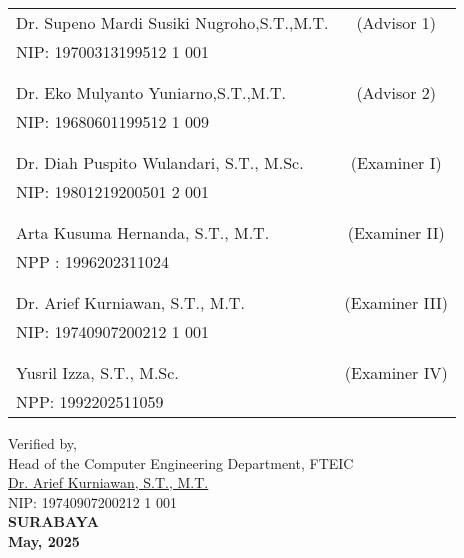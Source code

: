     \noindent
    \begin{tabularx}{\textwidth}{X c}
      Dr. Supeno Mardi Susiki Nugroho,S.T.,M.T.          & (Advisor 1) \\
      NIP: 19700313199512 1 001       & \\
      &  \\
      &  \\
      Dr. Eko Mulyanto Yuniarno,S.T.,M.T.     & (Advisor 2) \\
      NIP: 19680601199512 1 009       & \\
      &  \\
      &  \\
      Dr. Diah Puspito Wulandari, S.T., M.Sc.  & (Examiner I) \\
      NIP: 19801219200501 2 001      & \\
      &  \\
      &  \\
      Arta Kusuma Hernanda, S.T., M.T.  & (Examiner II) \\
      NPP : 1996202311024       & \\
      &  \\
      &  \\
      Dr. Arief Kurniawan, S.T., M.T.           & (Examiner III) \\
      NIP: 19740907200212 1 001       & \\
      &  \\
      &  \\
      Yusril Izza, S.T., M.Sc.           & (Examiner IV) \\
      NPP: 1992202511059       & \\
    \end{tabularx}
  \endgroup

\begin{center}
  Verified by,\\
  Head of the Computer Engineering Department, FTEIC\\
  \vspace{9ex}
  \underline{Dr. Arief Kurniawan, S.T., M.T. }\\
  NIP: 19740907200212 1 001 \\
  \vspace{6ex}
  \textbf{SURABAYA} \\
  \textbf{May, 2025}
\end{center}
\endgroup